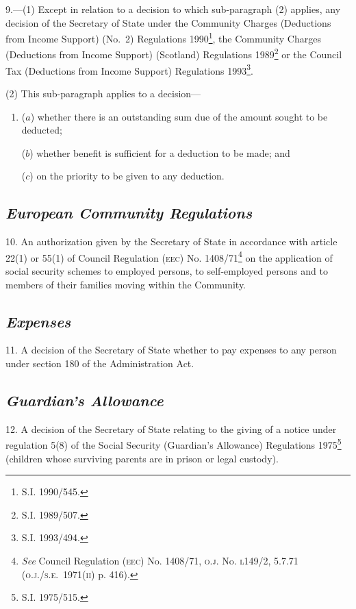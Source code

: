 \documentclass[12pt,a4paper]{article}
\begin{document}
\medskip

9.—(1) Except in relation to a decision to which sub-paragraph (2) applies, any decision of the Secretary of State under the Community Charges (Deductions from Income Support) (No.\ 2) Regulations 1990\footnote{\frenchspacing S.I. 1990/545.}, the Community Charges (Deductions from Income Support) (Scotland) Regulations 1989\footnote{\frenchspacing S.I. 1989/507.} or the Council Tax (Deductions from Income Support) Regulations 1993\footnote{\frenchspacing S.I. 1993/494.}.%

(2) This sub-paragraph applies to a decision—
\begin{enumerate}\item[]
($a$) whether there is an outstanding sum due of the amount sought to be deducted;

($b$) whether benefit is sufficient for a deduction to be made; and

($c$) on the priority to be given to any deduction.
\end{enumerate}

\subsection*{\itshape European Community Regulations}

10.  An authorization given by the Secretary of State in accordance with article 22(1) or 55(1) of Council Regulation \textsc{\lowercase{(EEC)}} No. 1408/71\footnote{\frenchspacing \emph{See} Council Regulation \textsc{\lowercase{(EEC)}} No. 1408/71, \textsc{\lowercase{O.J.}} No. \textsc{\lowercase{L149/2, 5.7.71 (O.J./S.E.~1971(II)}} p. 416).} on the application of social security schemes to employed persons, to self-employed persons and to members of their families moving within the Community.

\subsection*{\itshape Expenses}

11.  A decision of the Secretary of State whether to pay expenses to any person under section 180 of the Administration Act.

\subsection*{\itshape Guardian’s Allowance}

12.  A decision of the Secretary of State relating to the giving of a notice under regulation 5(8) of the Social Security (Guardian’s Allowance) Regulations 1975\footnote{\frenchspacing S.I. 1975/515.} (children whose surviving parents are in prison or legal custody).
\end{document}
